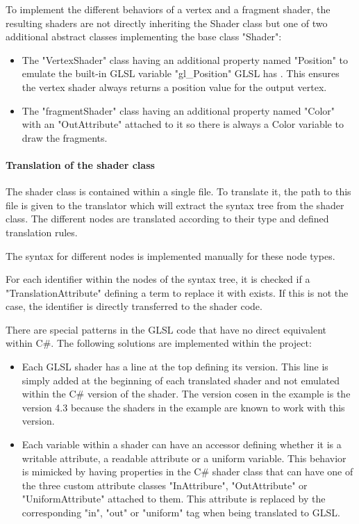 To implement the different behaviors of a vertex and a fragment shader, the resulting shaders are not directly inheriting the Shader class but one of two additional abstract classes implementing the base class "Shader":
\begin{itemize}
\item The "VertexShader" class having an additional property named "Position" to emulate the built-in GLSL variable "gl\_Position" GLSL has . This ensures the vertex shader always returns a position value for the output vertex.
\item The "fragmentShader" class having an additional property named "Color" with an "OutAttribute" attached to it so there is always a Color variable to draw the fragments.
\end{itemize}

\paragraph{Translation of the shader class}

The shader class is contained within a single file. To translate it, the path to this file is given to the translator which will extract the syntax tree from the shader class. The different nodes are translated according to their type and defined translation rules.

The syntax for different nodes is implemented manually for these node types.

For each identifier within the nodes of the syntax tree, it is checked if a "TranslationAttribute" defining a term to replace it with exists. If this is not the case, the identifier is directly transferred to the shader code. 

There are special patterns in the GLSL code that have no direct equivalent within C\#. The following solutions are implemented within the project:
\begin{itemize}
\item Each GLSL shader has a line at the top defining its version. This line is simply added at the beginning of each translated shader and not emulated within the C\# version of the shader. The version cosen in the example is the version 4.3 because the shaders in the example are known to work with this version.

\item Each variable within a shader can have an accessor defining whether it is a writable attribute, a readable attribute or a uniform variable. This behavior is mimicked by having properties in the C\# shader class that can have one of the three custom attribute classes "InAttribure", "OutAttribute" or "UniformAttribute" attached to them. This attribute is replaced by the corresponding "in", "out" or "uniform" tag when being translated to GLSL.
\end{itemize}

